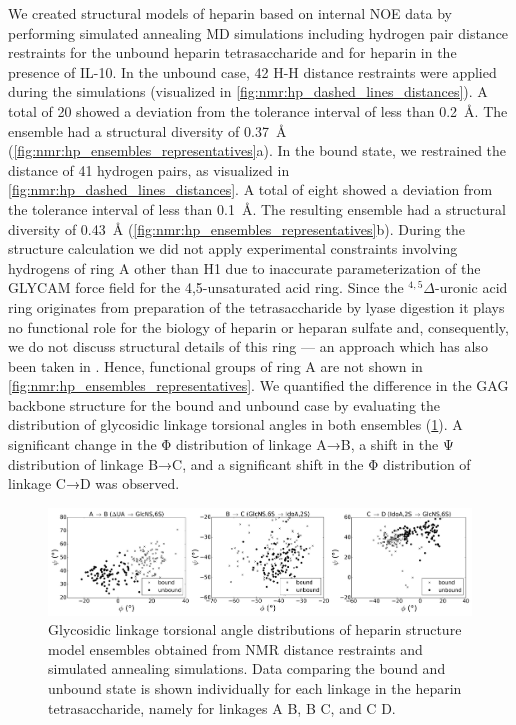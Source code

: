 We created structural models of heparin based on internal NOE data by performing
simulated annealing MD simulations including hydrogen pair distance restraints
for the unbound heparin tetrasaccharide and for heparin in the presence of
IL-10. In the unbound case, 42 H-H distance restraints were applied during the
simulations (visualized in \cref{fig:nmr:hp_dashed_lines_distances}). A total of
20 showed a deviation from the tolerance interval of less than
\SI{0.2}{\angstrom}. The ensemble had a structural diversity of
\SI{0.37}{\angstrom} (\cref{fig:nmr:hp_ensembles_representatives}a). In the
bound state, we restrained the distance of 41 hydrogen pairs, as visualized in
\cref{fig:nmr:hp_dashed_lines_distances}. A total of eight showed a deviation
from the tolerance interval of less than \SI{0.1}{\angstrom}. The resulting
ensemble had a structural diversity of \SI{0.43}{\angstrom}
(\cref{fig:nmr:hp_ensembles_representatives}b). During the structure calculation
we did not apply experimental constraints involving hydrogens of ring A other
than H1 due to inaccurate parameterization of the GLYCAM force field for the
4,5-unsaturated acid ring. Since the ${}^{4,5}\Delta$-uronic acid ring
originates from preparation of the tetrasaccharide by lyase digestion it plays
no functional role for the biology of heparin or heparan sulfate and,
consequently, we do not discuss structural details of this ring --- an approach
which has also been taken in \cite{jin_heparin_2009}. Hence, functional groups
of ring A are not shown in \cref{fig:nmr:hp_ensembles_representatives}. We
quantified the difference in the GAG backbone structure for the bound and
unbound case by evaluating the distribution of glycosidic linkage torsional
angles in both ensembles (\cref{fig:nmr:hp_glyco_dihedral_distributions}). A
significant change in the Φ distribution of linkage A→B, a shift in the Ψ
distribution of linkage B→C, and a significant shift in the Φ distribution of
linkage C→D was observed.


\begin{figure}
\begin{adjustwidth}{-2cm}{-2cm}
\centering
\includegraphics[width=1.3\textwidth]{gfx/nmr/Figure_08_glycolinkage_dihedrals_bound_vs_free_three_3panels_05.png}
\caption[]{
Glycosidic linkage torsional angle distributions of heparin structure model
ensembles obtained from NMR distance restraints and simulated annealing
simulations. Data comparing the bound and unbound state is shown individually
for each linkage in the heparin tetrasaccharide, namely for linkages A
\rightarrow B, B \rightarrow C, and C \rightarrow D.
}
\label{fig:nmr:hp_glyco_dihedral_distributions}
\end{adjustwidth}
\end{figure}

